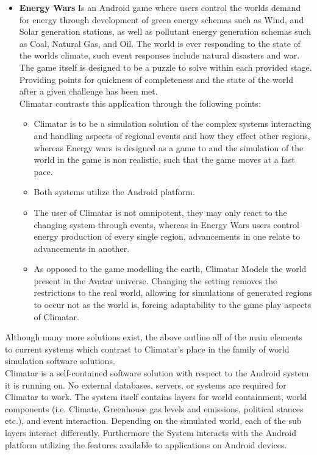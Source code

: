 \documentclass[]{article}
\begin{document}
\begin{itemize}
	\item \textbf{Energy Wars}
		Is an Android game\cite{EW} where users control the worlds demand for energy through development of green energy schemas such as Wind, and Solar generation stations, as well as pollutant energy generation schemas such as Coal, Natural Gas, and Oil. The world is ever responding to the state of the worlds climate, such event responses include natural disasters and war. The game itself is designed to be a puzzle to solve within each provided stage. Providing points for quickness of completeness and the state of the world after a given challenge has been met.\\
		Climatar contrasts this application through the following points:
		\begin{itemize}
			\item Climatar is to be a simulation solution of the complex systems interacting and handling aspects of regional events and how they effect other regions, whereas Energy wars is designed as a game to and the simulation of the world in the game is non realistic, such that the game moves at a fast pace.
			\item Both systems utilize the Android platform.
			\item The user of Climatar is not omnipotent, they may only react to the changing system through events, whereas in Energy Wars users control energy production of every single region, advancements in one relate to advancements in another.
			\item As opposed to the game modelling the earth, Climatar Models the world present in the Avatar universe. Changing the setting removes the restrictions to the real world, allowing for  simulations of generated regions to occur not as the world is, forcing adaptability to the game play aspects of Climatar.
		\end{itemize}
\end{itemize}

Although many more solutions exist, the above outline all of the main elements to current systems which contrast to Climatar's place in the family of world simulation software solutions.\\

Climatar is a self-contained software solution with respect to the Android system it is running on. No external databases, servers, or systems are required for Climatar to work. The system itself contains layers for world containment, world components (i.e. Climate, Greenhouse gas levels and emissions, political stances etc.), and event interaction. Depending on the simulated world, each of the sub layers interact differently. Furthermore the System interacts with the Android platform utilizing the features available to applications on Android devices.
\end{document}
